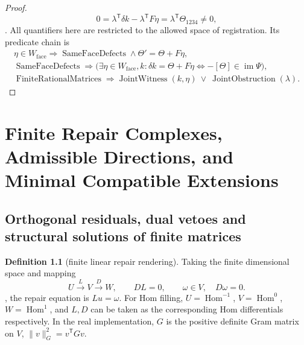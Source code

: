 \documentclass[12pt,a4paper,openany,notitlepage]{report}
\theoremstyle{plain}
\theoremstyle{definition}
\newtheorem{definition}[theorem]{Definition}
\theoremstyle{remark}
\begin{document}
\begin{CJK*}
\begin{proof}
\[ 0=\lambda^{\mathsf T}\delta k-\lambda^{\mathsf T}F\eta
   =\lambda^{\mathsf T}\Theta_{1234}\ne0,
\]. All quantifiers here are restricted to the allowed space of registration. Its predicate chain is \[
 \begin{gathered}
 \eta\in W_{\mathrm{face}}
 \Rightarrow\operatorname{SameFaceDefects}
 \land\Theta'=\Theta+F\eta,\\
 \operatorname{SameFaceDefects}
 \Rightarrow
 \bigl(\exists\eta\in W_{\mathrm{face}},k:\delta k=\Theta+F\eta
 \Longleftrightarrow-[\Theta]\in\operatorname{im}\Psi\bigr),\\
 \operatorname{FiniteRationalMatrices}
 \Rightarrow
 \operatorname{JointWitness}(k,\eta)
 \ \vee\ \operatorname{JointObstruction}(\lambda).
 \end{gathered}
\]\end{proof}


\chapter{Finite Repair Complexes, Admissible Directions, and Minimal Compatible Extensions}
\label{exp:ch:extension}


\section { Orthogonal residuals, dual vetoes and structural solutions of finite matrices }\label{hgov:linear-certificate}


\begin{definition}
[finite linear repair rendering]\label{hgov:def-linear}
Taking the finite dimensional space and mapping \[
 U\xrightarrow{L}V\xrightarrow{D}W,\qquad DL=0,
 \qquad \omega\in V,\quad D\omega=0.
\], the repair equation is $Lu=\omega$. For Hom filling, $U=\operatorname{Hom}^{-1}$, $V=\operatorname{Hom}^{0}$, $W=\operatorname{Hom}^{1}$, and $L,D$ can be taken as the corresponding Hom differentials respectively. In the real implementation, $G$ is the positive definite Gram matrix on $V$, $\|v\|_G^2=v^{\mathsf T}Gv$.\end{definition}



\end{CJK*}
\end{document}
